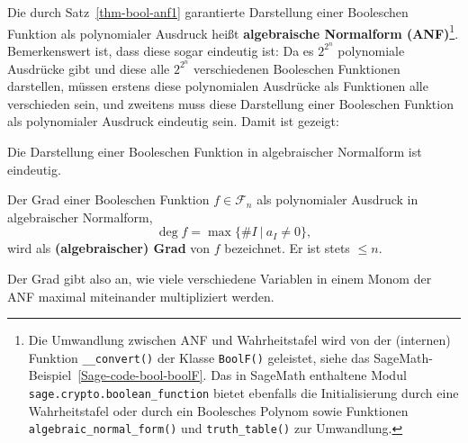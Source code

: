 \begin{refsegment}
Die durch Satz~\ref{thm-bool-anf1} garantierte Darstellung einer
Booleschen Funktion als polynomialer Ausdruck
heißt {\bf algebraische
Normalform (ANF)}\footnote{%
   Die Umwandlung zwischen ANF und Wahrheitstafel
   wird von der (internen) Funktion {\tt \_\_convert()} der Klasse
   {\tt BoolF()} geleistet, siehe das SageMath-Beispiel~\ref{Sage-code-bool-boolF}.
   Das in SageMath enthaltene Modul {\tt sage.crypto.boolean\_function}
   bietet ebenfalls die Initialisierung durch eine Wahrheitstafel
   oder durch ein Boolesches Polynom sowie Funktionen
   {\tt algebraic\_normal\_form()}
   und {\tt truth\_table()} zur Umwandlung.
}. Bemerkenswert ist, dass diese sogar eindeutig ist:
Da es $2^{2^n}$ polynomiale Ausdrücke gibt und diese alle $2^{2^n}$
verschiedenen Booleschen Funktionen darstellen, müssen erstens diese
polynomialen Ausdrücke als Funktionen alle verschieden sein, und
zweitens muss diese Darstellung einer Booleschen Funktion als
polynomialer Ausdruck eindeutig sein. Damit ist gezeigt:

\begin{satz}\label{thm-bool-anf2}
   Die Darstellung einer Booleschen Funktion in algebraischer
    Normalform
   ist eindeutig.
\end{satz}

\begin{definition}
   Der Grad einer Booleschen
   Funktion $f \in \mathcal{F}_n$ als
   polynomialer Ausdruck in algebraischer Normalform,
\[
  \deg f = \max\{\#I \:|\: a_I \neq 0\},
\]
   wird als {\bf (algebraischer) Grad} von $f$
   bezeichnet. Er ist stets $\leq n$.
\end{definition}

Der Grad gibt also an, wie viele verschiedene Variablen in einem
Monom der ANF
maximal miteinander multipliziert werden.


\end{refsegment}
